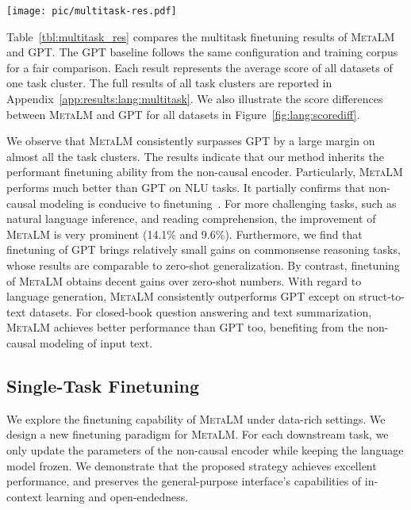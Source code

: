 \documentclass{article}
\theoremstyle{plain}
\theoremstyle{definition}
\theoremstyle{remark}
\newcommand\ours{\textsc{MetaLM}}
\begin{document}
\begin{figure*}[t]
\centering
\texttt{[image: pic/multitask-res.pdf]}
\caption{Score difference of multitask finetuning results between \ours{} and GPT. We observe that \ours{} achieves consistent improvements over all tasks except the cluster of struct to text.}
\label{fig:lang:scorediff}
\end{figure*}

Table~\ref{tbl:multitask_res} compares the multitask finetuning results of \ours{} and GPT.
The GPT baseline follows the same configuration and training corpus for a fair comparison.
Each result represents the average score of all datasets of one task cluster.
The full results of all task clusters are reported in Appendix~\ref{app:results:lang:multitask}.
We also illustrate the score differences between \ours{} and GPT for all datasets in Figure~\ref{fig:lang:scorediff}.

We observe that \ours{} consistently surpasses GPT by a large margin on almost all the task clusters.
The results indicate that our method inherits the performant finetuning ability from the non-causal encoder.
Particularly, \ours{} performs much better than GPT on NLU tasks.
It partially confirms that non-causal modeling is conducive to finetuning~\citep{what:lm:objective,unifypara,role:bidirectionality}.
For more challenging tasks, such as natural language inference, and reading comprehension, the improvement of \ours{} is very prominent (14.1\% and 9.6\%).
Furthermore, we find that finetuning of GPT brings relatively small gains on commonsense reasoning tasks, whose results are comparable to zero-shot generalization.
By contrast, finetuning of \ours{} obtains decent gains over zero-shot numbers.
With regard to language generation, \ours{} consistently outperforms GPT except on struct-to-text datasets.
For closed-book question answering and text summarization, \ours{} achieves better performance than GPT too, benefiting from the non-causal modeling of input text.


\subsection{Single-Task Finetuning}
\label{sec:lang:ft}

We explore the finetuning capability of \ours{} under data-rich settings.
We design a new finetuning paradigm for \ours{}.
For each downstream task, we only update the parameters of the non-causal encoder while keeping the language model frozen.
We demonstrate that the proposed strategy achieves excellent performance, and preserves the general-purpose interface's capabilities of in-context learning and open-endedness.
\end{document}
